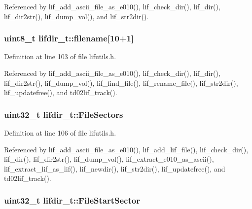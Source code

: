 Referenced by lif\+\_\+add\+\_\+ascii\+\_\+file\+\_\+as\+\_\+e010(), lif\+\_\+check\+\_\+dir(), lif\+\_\+dir(), lif\+\_\+dir2str(), lif\+\_\+dump\+\_\+vol(), and lif\+\_\+str2dir().

\subsubsection[{\texorpdfstring{filename}{filename}}]{\setlength{\rightskip}{0pt plus 5cm}uint8\+\_\+t lifdir\+\_\+t\+::filename\mbox{[}10+1\mbox{]}}\hypertarget{structlifdir__t_a700fd2eb77539353ba670b76d9acb29d}{}\label{structlifdir__t_a700fd2eb77539353ba670b76d9acb29d}


Definition at line 103 of file lifutils.\+h.



Referenced by lif\+\_\+add\+\_\+ascii\+\_\+file\+\_\+as\+\_\+e010(), lif\+\_\+check\+\_\+dir(), lif\+\_\+dir(), lif\+\_\+dir2str(), lif\+\_\+dump\+\_\+vol(), lif\+\_\+find\+\_\+file(), lif\+\_\+rename\+\_\+file(), lif\+\_\+str2dir(), lif\+\_\+updatefree(), and td02lif\+\_\+track().

\subsubsection[{\texorpdfstring{File\+Sectors}{FileSectors}}]{\setlength{\rightskip}{0pt plus 5cm}uint32\+\_\+t lifdir\+\_\+t\+::\+File\+Sectors}\hypertarget{structlifdir__t_a92382e062294ebdc632c6c78dcd397aa}{}\label{structlifdir__t_a92382e062294ebdc632c6c78dcd397aa}


Definition at line 106 of file lifutils.\+h.



Referenced by lif\+\_\+add\+\_\+ascii\+\_\+file\+\_\+as\+\_\+e010(), lif\+\_\+add\+\_\+lif\+\_\+file(), lif\+\_\+check\+\_\+dir(), lif\+\_\+dir(), lif\+\_\+dir2str(), lif\+\_\+dump\+\_\+vol(), lif\+\_\+extract\+\_\+e010\+\_\+as\+\_\+ascii(), lif\+\_\+extract\+\_\+lif\+\_\+as\+\_\+lif(), lif\+\_\+newdir(), lif\+\_\+str2dir(), lif\+\_\+updatefree(), and td02lif\+\_\+track().

\subsubsection[{\texorpdfstring{File\+Start\+Sector}{FileStartSector}}]{\setlength{\rightskip}{0pt plus 5cm}uint32\+\_\+t lifdir\+\_\+t\+::\+File\+Start\+Sector}\hypertarget{structlifdir__t_ac17bb6f653b05078f5fc8112c21286f2}{}\label{structlifdir__t_ac17bb6f653b05078f5fc8112c21286f2}


